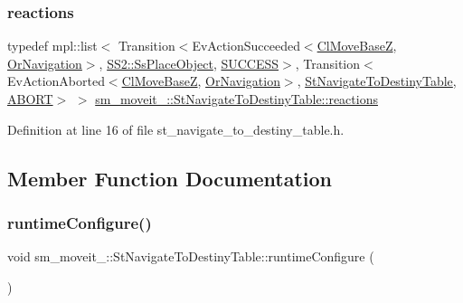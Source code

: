 \subsubsection{\texorpdfstring{reactions}{reactions}}
{\footnotesize\ttfamily typedef mpl\+::list$<$ Transition$<$Ev\+Action\+Succeeded$<$\hyperlink{classcl__move__base__z_1_1ClMoveBaseZ}{Cl\+Move\+BaseZ}, \hyperlink{classsm__moveit__4_1_1OrNavigation}{Or\+Navigation}$>$, \hyperlink{structsm__moveit__4_1_1SS2_1_1SsPlaceObject}{S\+S2\+::\+Ss\+Place\+Object}, \hyperlink{classSUCCESS}{S\+U\+C\+C\+E\+SS}$>$, Transition$<$Ev\+Action\+Aborted$<$\hyperlink{classcl__move__base__z_1_1ClMoveBaseZ}{Cl\+Move\+BaseZ}, \hyperlink{classsm__moveit__4_1_1OrNavigation}{Or\+Navigation}$>$, \hyperlink{structsm__moveit__4_1_1StNavigateToDestinyTable}{St\+Navigate\+To\+Destiny\+Table}, \hyperlink{classABORT}{A\+B\+O\+RT}$>$ $>$ \hyperlink{structsm__moveit__4_1_1StNavigateToDestinyTable_ae6317d7146c5e5611ad162f41e80c708}{sm\+\_\+moveit\+\_\+::\+St\+Navigate\+To\+Destiny\+Table\+::reactions}}



Definition at line 16 of file st\+\_\+navigate\+\_\+to\+\_\+destiny\+\_\+table.\+h.



\subsection{Member Function Documentation}
\mbox{\label{structsm__moveit__4_1_1StNavigateToDestinyTable_a0915874e66bb71287faacf856c0ceaed}} 
\subsubsection{\texorpdfstring{runtime\+Configure()}{runtimeConfigure()}}
{\footnotesize\ttfamily void sm\+\_\+moveit\+\_\+::\+St\+Navigate\+To\+Destiny\+Table\+::runtime\+Configure (\begin{DoxyParamCaption}{ }\end{DoxyParamCaption})\hspace{0.3cm}{\ttfamily [inline]}}



